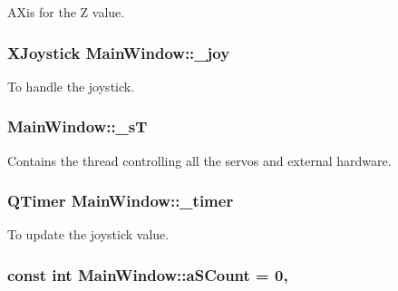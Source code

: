 A\+Xis for the Z value. 

\hypertarget{a00005_a671f35800890e518713e1946671d8730}{}
\subsubsection[{\+\_\+joy}]{\setlength{\rightskip}{0pt plus 5cm}X\+Joystick Main\+Window\+::\+\_\+joy\hspace{0.3cm}{\ttfamily [private]}}\label{a00005_a671f35800890e518713e1946671d8730}


To handle the joystick. 

\hypertarget{a00005_a97f8ecc7ecb930b796178cef7b975013}{}
\subsubsection[{\+\_\+s\+T}]{ Main\+Window\+::\+\_\+s\+T\hspace{0.3cm}{\ttfamily [private]}}\label{a00005_a97f8ecc7ecb930b796178cef7b975013}


Contains the thread controlling all the servos and external hardware. 

\hypertarget{a00005_a254b03b878cfda75c1c411a2f8568d33}{}
\subsubsection[{\+\_\+timer}]{\setlength{\rightskip}{0pt plus 5cm}Q\+Timer Main\+Window\+::\+\_\+timer\hspace{0.3cm}{\ttfamily [private]}}\label{a00005_a254b03b878cfda75c1c411a2f8568d33}


To update the joystick value. 

\hypertarget{a00005_a42c44af9c0eebc33f4e81f02e15b0461}{}
\subsubsection[{a\+S\+Count}]{\setlength{\rightskip}{0pt plus 5cm}const int Main\+Window\+::a\+S\+Count = 0\hspace{0.3cm}{\ttfamily [static]}, {\ttfamily [private]}}\label{a00005_a42c44af9c0eebc33f4e81f02e15b0461}


